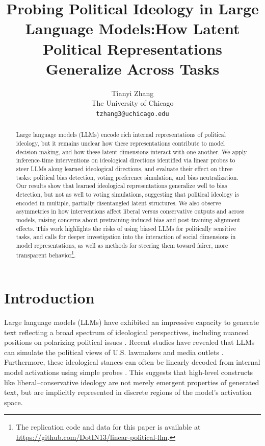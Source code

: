 \documentclass[11pt]{article}
\title{Probing Political Ideology in Large Language Models:\break How Latent Political Representations Generalize Across Tasks}
\author{Tianyi Zhang \\
  The University of Chicago \\
  \texttt{tzhang3@uchicago.edu}}
\begin{document}
\maketitle

\begin{abstract}
Large language models (LLMs) encode rich internal representations of political ideology, but it remains unclear how these representations contribute to model decision-making, and how these latent dimensions interact with one another. We apply inference-time interventions on ideological directions identified via linear probes to steer LLMs along learned ideological directions, and evaluate their effect on three tasks: political bias detection, voting preference simulation, and bias neutralization. Our results show that learned ideological representations generalize well to bias detection, but not as well to voting simulations, suggesting that political ideology is encoded in multiple, partially disentangled latent structures. We also observe asymmetries in how interventions affect liberal versus conservative outputs and across models, raising concerns about pretraining-induced bias and post-training alignment effects. This work highlights the risks of using biased LLMs for politically sensitive tasks, and calls for deeper investigation into the interaction of social dimensions in model representations, as well as methods for steering them toward fairer, more transparent behavior\footnote{The replication code and data for this paper is available at \href{https://github.com/DotIN13/linear-political-llm}{https://github.com/DotIN13/linear-political-llm}.}.
\end{abstract}

\section{Introduction}

Large language models (LLMs) have exhibited an impressive capacity to generate text reflecting a broad spectrum of ideological perspectives, including nuanced positions on polarizing political issues \citep{argyleOutOneMany2023, kimLinearRepresentationsPolitical2025, wuLargeLanguageModels2023a, lemensPositioningPoliticalTexts2025}. Recent studies have revealed that LLMs can simulate the political views of U.S. lawmakers and media outlets \citep{pmlr-v202-santurkar23a, bernardelleMappingInfluencingPolitical2024}. Furthermore, these ideological stances can often be linearly decoded from internal model activations using simple probes \citep{kimLinearRepresentationsPolitical2025, parkLinearRepresentationHypothesis2024}. This suggests that high-level constructs like liberal--conservative ideology are not merely emergent properties of generated text, but are implicitly represented in discrete regions of the model’s activation space.
\end{document}
